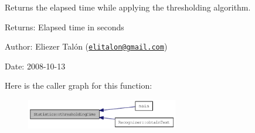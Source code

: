 Returns the elapsed time while applying the thresholding algorithm. 

\begin{Desc}
\item[Returns:]Elapsed time in seconds\end{Desc}
\begin{Desc}
\item[Author:]Eliezer Talón (\href{mailto:elitalon@gmail.com}{\tt elitalon@gmail.com}) \end{Desc}
\begin{Desc}
\item[Date:]2008-10-13 \end{Desc}


Here is the caller graph for this function:\nopagebreak
\begin{figure}[H]
\begin{center}
\leavevmode
\includegraphics[width=188pt]{class_statistics_79a7c11e89528f21b663153c2636216a_icgraph}
\end{center}
\end{figure}

